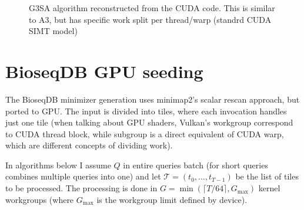 \begin{figure}[H]
\caption{G3SA algorithm reconstructed from the CUDA code. This is similar to A3, but has specific work split per thread/warp (standrd CUDA SIMT model)}
\label{fig:g3sa-minimizer-kernel}
\end{figure}

\section{BioseqDB GPU seeding}
\label{sec:vulkan-minimizer-scheduling}

The BioseqDB minimizer generation uses minimap2's scalar rescan approach, but ported to GPU. The input is divided into tiles, where each invocation handles just one tile
(when talking about GPU shaders, Vulkan's workgroup correspond to CUDA thread block, while subgroup is a direct equivalent of CUDA warp, which are different concepts of dividing work). 

In algorithms below I assume $Q$ in entire queries batch (for short queries combines multiple queries into one) and let
$\mathcal T=(t_0,\ldots,t_{T-1})$ be the list of tiles to be processed. The processing is done in $G=\min(\lceil T/64\rceil,G_{\max})$ kernel workgroups (where $G_{\max}$ is the workgroup limit defined by device).

